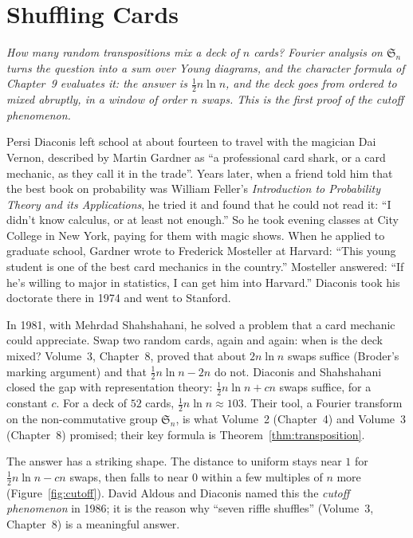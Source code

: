 \chapter{Shuffling Cards}

\begin{center}\itshape
How many random transpositions mix a deck of $n$ cards? Fourier analysis on $\mathfrak S_n$ turns the question into a sum over Young diagrams, and the character formula of Chapter~9 evaluates it: the answer is $\frac12n\ln n$, and the deck goes from ordered to
mixed abruptly, in a window of order $n$ swaps. This is the first proof of the cutoff phenomenon.
\end{center}

Persi Diaconis left school at about fourteen to travel with the magician Dai Vernon, described by Martin Gardner as ``a professional card shark, or a card mechanic, as they call it in the trade''. Years later, when a friend told him that the best book
on probability was William Feller's \emph{Introduction to Probability Theory and its Applications}, he tried it and found that he could not read it: ``I didn't know calculus, or at least not enough.'' So he took evening classes at City College in New York, paying
for them with magic shows. When he applied to graduate school, Gardner wrote to Frederick Mosteller at Harvard: ``This young student is one of the best card mechanics in the country.'' Mosteller answered: ``If he's willing to major in statistics, I can get him into
Harvard.'' Diaconis took his doctorate there in 1974 and went to Stanford.

In 1981, with Mehrdad Shahshahani, he solved a problem that a card mechanic could appreciate. Swap two random cards, again and again: when is the deck mixed? Volume~3, Chapter~8, proved that about $2n\ln n$ swaps suffice (Broder's marking argument) and
that $\frac12n\ln n-2n$ do not. Diaconis and Shahshahani closed the gap with representation theory: $\frac12n\ln n+cn$ swaps suffice, for a constant $c$. For a deck of $52$ cards, $\frac12n\ln n\approx103$. Their tool, a Fourier transform on the non-commutative
group $\mathfrak S_n$, is what Volume~2 (Chapter~4) and Volume~3 (Chapter~8) promised; their key formula is Theorem~\ref{thm:transposition}.

The answer has a striking shape. The distance to uniform stays near $1$ for $\frac12n\ln n-cn$ swaps, then falls to near $0$ within a few multiples of $n$ more (Figure~\ref{fig:cutoff}). David Aldous and Diaconis named this the \emph{cutoff phenomenon} in 1986; it
is the reason why ``seven riffle shuffles'' (Volume~3, Chapter~8) is a meaningful answer.

